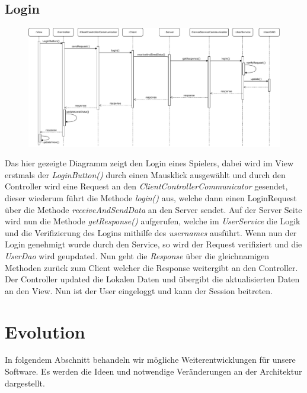 \documentclass[fontsize=12pt,paper=a4,twoside]{scrartcl}
\begin{document}
\subsection{Login}

\begin{figure}[H]
\begin{center}
  \includegraphics[width=\linewidth]{UML/Sequenz-Client-login.pdf}
\end{center}
\end{figure}

Das hier gezeigte Diagramm zeigt den Login eines Spielers, dabei wird im View erstmals der \textit{LoginButton()} durch einen Mausklick ausgewählt und durch den Controller wird eine Request an den \textit{ClientControllerCommunicator} gesendet, dieser wiederum führt die Methode \textit{login()} aus, welche dann einen LoginRequest über die Methode \textit{receiveAndSendData} an den Server sendet. Auf der Server Seite wird nun die Methode \textit{getResponse()} aufgerufen, welche im \textit{UserService} die Logik und die Verifizierung des Logins mithilfe des \textit{usernames} ausführt. Wenn nun der Login genehmigt wurde durch den Service, so wird der Request verifiziert und die \textit{UserDao} wird geupdated. Nun geht die \textit{Response} über die gleichnamigen Methoden zurück zum Client welcher die Response weitergibt an den Controller. Der Controller updated die Lokalen Daten und übergibt die aktualisierten Daten an den View. Nun ist der User eingeloggt und kann der Session beitreten.


\section{Evolution} \label{sec:evolution}


In folgendem Abschnitt behandeln wir mögliche Weiterentwicklungen für unsere Software. Es werden die Ideen und notwendige Veränderungen an der Architektur dargestellt.
\end{document}
